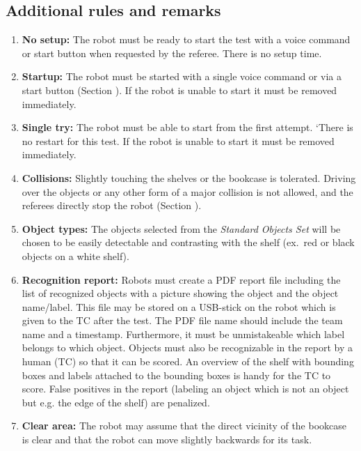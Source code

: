 \subsection{Additional rules and remarks}
\begin{enumerate}
\item \textbf{No setup:} The robot must be ready to start the test with a voice command or start button when requested by the referee. There is no setup time.
\item \textbf{Startup:} The robot must be started with a single voice command or via a start button (Section ). If the robot is unable to start it must be removed immediately.
\item \textbf{Single try:} The robot must be able to start from the first attempt. 
`There is no restart for this test. If the robot is unable to start it must be removed immediately.
\item \textbf{Collisions:} Slightly touching the shelves or the bookcase is tolerated. 
  Driving over the objects or any other form of a major collision is not allowed, and the referees directly stop the robot (Section ).
\item \textbf{Object types:} The objects selected from the \textit{Standard Objects Set} will be chosen to be easily detectable and contrasting with the shelf (ex.~red or black objects on a white shelf).
\item \textbf{Recognition report:} Robots must create a PDF report file including the list of recognized objects with a picture showing the object and the object name/label.
  This file may be stored on a USB-stick on the robot which is given to the TC after the test. The PDF file name should include the team name and a timestamp. 
  Furthermore, it must be unmistakeable which label belongs to which object. Objects must also be recognizable in the report by a human (TC) so that it can be scored. 
  An overview of the shelf with bounding boxes and labels attached to the bounding boxes is handy for the TC to score.
  False positives in the report (labeling an object which is not an object but e.g. the edge of the shelf) are penalized.
  \item \textbf{Clear area: } The robot may assume that the direct vicinity of the bookcase is clear and that the robot can move slightly backwards for its task. 
\end{enumerate}

